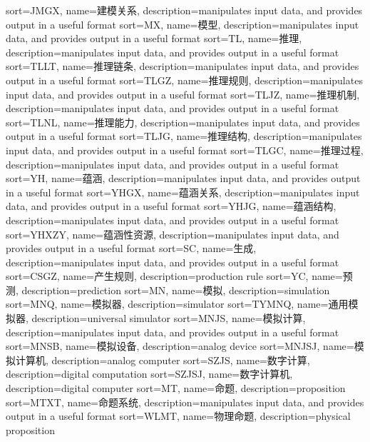 {
  sort=JMGX,
  name=建模关系,
  description={manipulates input data, and provides output in a useful format}
}
{
  sort=MX,
  name=模型,
  description={manipulates input data, and provides output in a useful format}
}
{
  sort=TL,
  name=推理,
  description={manipulates input data, and provides output in a useful format}
}
{
  sort=TLLT,
  name=推理链条,
  description={manipulates input data, and provides output in a useful format}
}
{
  sort=TLGZ,
  name=推理规则,
  description={manipulates input data, and provides output in a useful format}
}
{
  sort=TLJZ,
  name=推理机制,
  description={manipulates input data, and provides output in a useful format}
}
{
  sort=TLNL,
  name=推理能力,
  description={manipulates input data, and provides output in a useful format}
}
{
  sort=TLJG,
  name=推理结构,
  description={manipulates input data, and provides output in a useful format}
}
{
  sort=TLGC,
  name=推理过程,
  description={manipulates input data, and provides output in a useful format}
}
{
  sort=YH,
  name=蕴涵,
  description={manipulates input data, and provides output in a useful format}
}
{
  sort=YHGX,
  name=蕴涵关系,
  description={manipulates input data, and provides output in a useful format}
}
{
  sort=YHJG,
  name=蕴涵结构,
  description={manipulates input data, and provides output in a useful format}
}
{
  sort=YHXZY,
  name=蕴涵性资源,
  description={manipulates input data, and provides output in a useful format}
}
{
  sort=SC,
  name=生成,
  description={manipulates input data, and provides output in a useful format}
}
{
  sort=CSGZ,
  name=产生规则,
  description={production rule}
}
{
  sort=YC,
  name=预测,
  description={prediction}
}
{
  sort=MN,
  name=模拟,
  description={simulation}
}
{
  sort=MNQ,
  name=模拟器,
  description={simulator}
}
{
  sort=TYMNQ,
  name=通用模拟器,
  description={universal simulator}
}
{
  sort=MNJS,
  name=模拟计算,
  description={manipulates input data, and provides output in a useful format}
}
{
  sort=MNSB,
  name=模拟设备,
  description={analog device}
}
{
  sort=MNJSJ,
  name=模拟计算机,
  description={analog computer}
}
{
  sort=SZJS,
  name=数字计算,
  description={digital computation}
}
{
  sort=SZJSJ,
  name=数字计算机,
  description={digital computer}
}
{
  sort=MT,
  name=命题,
  description={proposition}
}
{
  sort=MTXT,
  name=命题系统,
  description={manipulates input data, and provides output in a useful format}
}
{
  sort=WLMT,
  name=物理命题,
  description={physical proposition}
}

